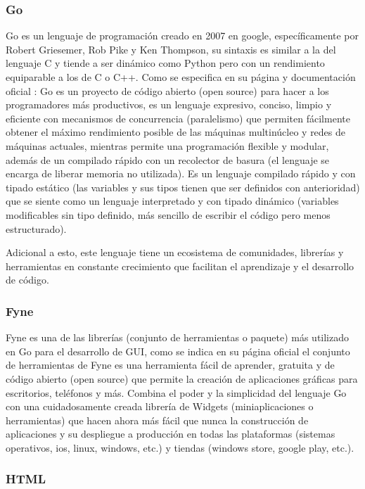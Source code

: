 \subsubsection{Go}
Go es un lenguaje de programación creado en 2007 en google, específicamente por
Robert Griesemer, Rob Pike y Ken Thompson, su sintaxis es similar a la del lenguaje
C y tiende a ser dinámico como Python pero con un rendimiento equiparable a los
de C o C++. Como se especifica en su página y documentación oficial
\textcite{GolangDocumentacion}: Go es un proyecto de código abierto (open source)
para hacer a los programadores más productivos, es un lenguaje expresivo, conciso,
limpio y eficiente con mecanismos de concurrencia (paralelismo) que permiten fácilmente
obtener el máximo rendimiento posible de las máquinas multinúcleo y redes de máquinas
actuales, mientras permite una programación flexible y modular, además de un compilado
rápido con un recolector de basura (el lenguaje se encarga de liberar memoria
no utilizada).
Es un lenguaje compilado rápido y con tipado estático (las variables y sus tipos tienen que
ser definidos con anterioridad) que se siente como un lenguaje interpretado y
con tipado dinámico (variables modificables sin tipo definido, más sencillo de
escribir el código pero menos estructurado).

Adicional a esto, este lenguaje tiene un ecosistema de comunidades, librerías y
herramientas en constante crecimiento que facilitan el aprendizaje y el desarrollo
de código.

\subsubsection{Fyne}

Fyne es una de las librerías (conjunto de herramientas o paquete) más utilizado
en Go para el desarrollo de GUI, como se indica en su página oficial \textcite{fyne}
el conjunto de herramientas de Fyne es una herramienta fácil de aprender, gratuita
y de código abierto (open source) que permite la creación de aplicaciones gráficas
para escritorios, teléfonos y más. Combina el poder y la simplicidad del lenguaje
Go con una cuidadosamente creada librería de Widgets (miniaplicaciones o herramientas)
que hacen ahora más fácil que nunca la construcción de aplicaciones y su despliegue
a producción en todas las plataformas (sistemas operativos, ios, linux, windows, etc.)
y tiendas (windows store, google play, etc.).

\subsubsection{HTML}

